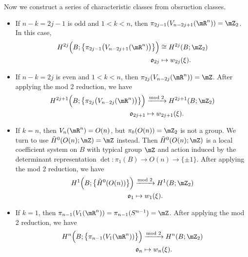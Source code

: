 Now we construct a series of characteristic classes from obsruction classes. 
\begin{itemize}
    \item If $n-k=2j-1$ is odd and $1<k<n$, then 
    $\pi_{2j-1}(V_{n-2j+1}(\mR^n)) = \mZ_2$. In this case, 
    \begin{align*}
        H^{2j}\Big(B;\big\{\pi_{2j-1}\big(V_{n-2j+1}(\mR^n)\big)\big\}\Big)
        &\cong H^{2j}(B;\mZ_2) \\ 
        \mathfrak{o}_{2j} &\mapsto w_{2j}(\xi).
    \end{align*}
    \item If $n-k=2j$ is even and $1<k<n$, then 
    $\pi_{2j}(V_{n-2j}(\mR^n)) = \mZ$. After applying the mod 2 reduction, 
    we have 
    \begin{align*}
        H^{2j+1}\Big(B;\big\{\pi_{2j}\big(V_{n-2j}(\mR^n)\big)\big\}\Big)
        &\xrightarrow{\text{mod } 2} H^{2j+1}(B;\mZ_2) \\ 
        \mathfrak{o}_{2j+1} &\mapsto w_{2j+1}(\xi).
    \end{align*}
    \item If $k=n$, then $V_n(\mR^n) = O(n)$, but $\pi_0(O(n)) = \mZ_2$ is 
    not a group. We turn to use $\tilde{H}^0(O(n);\mZ) = \mZ$ instead. Then 
    $\tilde{H}^0(O(n);\mZ)$ is a local coefficient system on $B$ with typical 
    group $\mZ$ and action induced by the determinant representation 
    $\det:\pi_1(B)\to O(n)\to \{\pm 1\}$. After applying the mod 2 reduction, 
    we have
    \begin{align*}
        H^1\Big(B;\big\{\tilde{H}^0(O(n))\big\}\Big)
        &\xrightarrow{\text{mod } 2} H^1(B;\mZ_2) \\ 
        \mathfrak{o}_1 &\mapsto w_1(\xi).
    \end{align*}
    \item If $k=1$, then $\pi_{n-1}(V_1(\mR^n)) = \pi_{n-1}(S^{n-1}) = \mZ$.
    After applying the mod 2 reduction, we have
    \begin{align*}
        H^n\Big(B;\big\{\pi_{n-1}(V_1(\mR^n))\big\}\Big)
        &\xrightarrow{\text{mod } 2} H^n(B;\mZ_2) \\ 
        \mathfrak{o}_n &\mapsto w_n(\xi).
    \end{align*}
\end{itemize}

